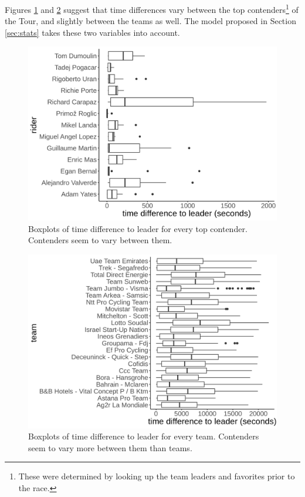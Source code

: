 \documentclass[aos,preprint]{imsart}
\begin{document}

Figures \ref{fig:timediff_contender} and \ref{fig:timediff_team} suggest that time differences vary between the top contenders\footnote{These were determined by looking up the team leaders and favorites prior to the race.} of the Tour, and slightly between the teams as well. The model proposed in Section \ref{sec:stats} takes these two variables into account.


\begin{figure}[h]
  \centering
  \includegraphics[scale=0.5]{fig/timediff_contender.png}
  \caption{Boxplots of time difference to leader for every top contender. Contenders seem to vary between them.}
  \label{fig:timediff_contender}
\end{figure}


\begin{figure}[h]
  \centering
  \includegraphics[scale=0.5]{fig/timediff_team.png}
  \caption{Boxplots of time difference to leader for every team. Contenders seem to vary more between them than teams.}
  \label{fig:timediff_team}
\end{figure}
\end{document}
